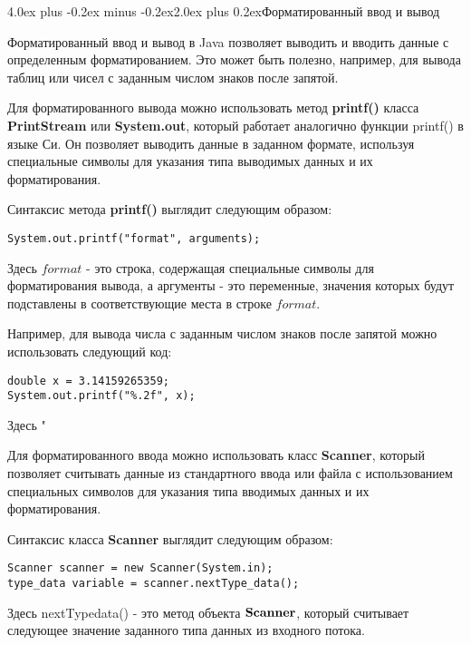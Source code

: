 \documentclass[12pt, a4paper]{book}%
\makeatletter
\renewcommand{\section}{\@startsection{section}{1}{1pt}%
{4.0ex plus -0.2ex minus -0.2ex}{2.0ex plus 0.2ex}{\centering\bf}}%
\makeatother
\begin{document}
{\section{Форматированный ввод и вывод}

Форматированный ввод и вывод в Java позволяет выводить и вводить данные с определенным форматированием. Это может быть полезно, например, для вывода таблиц или чисел с заданным числом знаков после запятой.

Для форматированного вывода можно использовать метод {\bf printf()} класса {\bf PrintStream} или {\bf System.out}, который работает аналогично функции printf() в языке Си. Он позволяет выводить данные в заданном формате, используя специальные символы для указания типа выводимых данных и их форматирования.

Синтаксис метода {\bf printf()} выглядит следующим образом:

\begin{lstlisting}
System.out.printf("format", arguments);
\end{lstlisting}

Здесь $format$ - это строка, содержащая специальные символы для форматирования вывода, а аргументы - это переменные, значения которых будут подставлены в соответствующие места в строке $format$.

Например, для вывода числа с заданным числом знаков после запятой можно использовать следующий код:

\begin{lstlisting}
double x = 3.14159265359;
System.out.printf("%.2f", x);
\end{lstlisting}

Здесь   "%

Для форматированного ввода можно использовать класс {\bf Scanner}, который позволяет считывать данные из стандартного ввода или файла с использованием специальных символов для указания типа вводимых данных и их форматирования.

Синтаксис класса {\bf Scanner} выглядит следующим образом:

\begin{lstlisting}
Scanner scanner = new Scanner(System.in);
type_data variable = scanner.nextType_data();
\end{lstlisting}

Здесь nextTypedata() - это метод объекта ${\bf Scanner}$, который считывает следующее значение заданного типа данных из входного потока.

}
\end{document}
